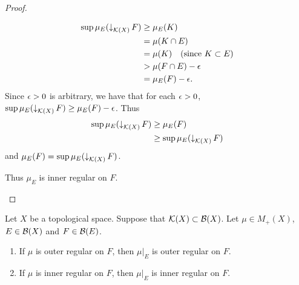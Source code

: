 \documentclass{book}
\begin{document}
\begin{proof}
\begin{enumerate}
\begin{itemize}
				\begin{align*}
					\sup \mu_E(\operatorname{\downarrow}_{\mathcal{K}(X)} F) 
					& \geq \mu_E(K) \\
					& = \mu(K \cap E) \\
					& = \mu(K) \quad \text{(since $K \subset E$)} \\
					& > \mu(F \cap E) - \epsilon \\
					& = \mu_E(F) - \epsilon.
				\end{align*}
				Since $\epsilon > 0$ is arbitrary, we have that for each $\epsilon > 0$, $\sup \mu_E(\operatorname{\downarrow}_{\mathcal{K}(X)} F) \geq \mu_E(F) - \epsilon$. Thus  
				\begin{align*}
					\sup \mu_E(\operatorname{\downarrow}_{\mathcal{K}(X)} F)
					& \geq \mu_E(F) \\
					& \geq \sup \mu_E(\operatorname{\downarrow}_{\mathcal{K}(X)} F)
				\end{align*} 
				and $\mu_E(F) = \sup \mu_E(\operatorname{\downarrow}_{\mathcal{K}(X)} F)$. 
			\end{itemize}
			Thus $\mu_E$ is inner regular on $F$.
		\end{enumerate}
	\end{proof}
	
	\begin{ex}
		Let $X$ be a topological space. Suppose that $\mathcal{K}(X) \subset \mathcal{B}(X)$. Let $\mu \in M_+(X)$, $E \in \mathcal{B}(X)$ and $F \in \mathcal{B}(E)$. 
		\begin{enumerate}
			\item If $\mu$ is outer regular on $F$, then $\mu|_E$ is outer regular on $F$.
			\item If $\mu$ is inner regular on $F$, then $\mu|_E$ is inner regular on $F$. 
		\end{enumerate}
	\end{ex}
	
\end{document}
